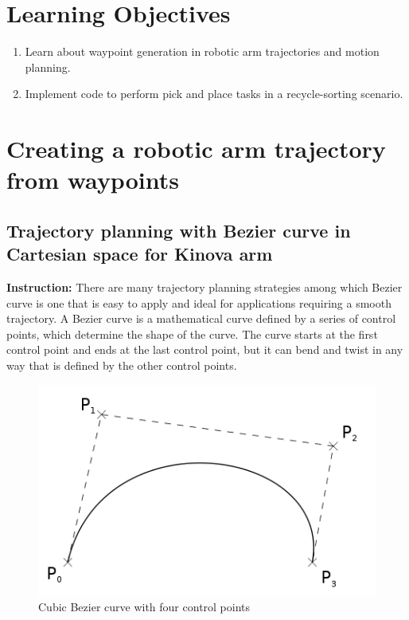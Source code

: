 \documentclass[12pt]{article}
\begin{document}
	\MakeScribeTop


\section{Learning Objectives}
\begin{enumerate}
    \item Learn about waypoint generation in robotic arm trajectories and motion planning.
    
    \item Implement code to perform pick and place tasks in a recycle-sorting scenario.
    
\end{enumerate}


\section{Creating a robotic arm trajectory from waypoints}
\subsection{Trajectory planning with Bezier curve in Cartesian space for Kinova arm}
\textbf{Instruction:}
There are many trajectory planning strategies among which Bezier curve is one that is easy to apply and ideal for applications requiring a smooth trajectory. A Bezier curve is a mathematical curve defined by a series of control points, which determine the shape of the curve. The curve starts at the first control point and ends at the last control point, but it can bend and twist in any way that is defined by the other control points.

\begin{figure}[H]
    \vspace{-10pt}
    \centering\includegraphics[width=12cm]{images/bezier.png}\vspace{-10pt}
    \caption{Cubic Bezier curve with four control points}\label{fig:curves}
    \end{figure}
\end{document}

